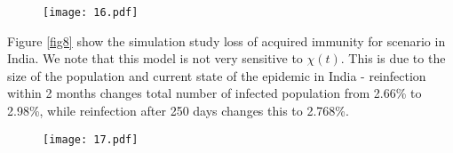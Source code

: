 \documentclass[10pt]{wlscirep}
\begin{document}
\begin{figure*}[!htb]
	\centering
	\begin{subfigure}[b]{0.7\textwidth}
		\centering
		\texttt{[image: 16.pdf]}
	\end{subfigure}
	\caption{Sensitivity of vaccine efficiency parameter $(1-\phi)$, where $\phi = 0$ represents vaccine that offers $100\%$ protection against infection, and $\xi_{\max} = 0.9$. $\phi$ is varied from 1.0 (No vaccination), 0.5 (50\% efficient), 0.25 (75\% efficient), 0.125(87.5\% efficient), and 0.0625 (93.75\% efficient) (Italy)}
	\label{fig5B} 
\end{figure*}
%
Figure \ref{fig8} show the simulation study loss of acquired immunity for scenario in India. We note that this model is not very sensitive to $\chi(t)$.  This is due to the size of the population and current state of the epidemic in India - reinfection within 2 months changes total number of infected population from 2.66\% to 2.98\%, while reinfection after 250 days changes this to 2.768\%.

%
\begin{figure*}[!htb]
	\centering
	\begin{subfigure}[b]{0.7\textwidth}
		\centering
		\texttt{[image: 17.pdf]}
	\end{subfigure}
	\caption{Sensitivity of $\chi(t)$ with loss of acquired immunity over time by $250, 200, 150, 100$ and $50$ days (India). Note that not all panels are in the same scale.}
	\label{fig8} 
\end{figure*}
\end{document}
